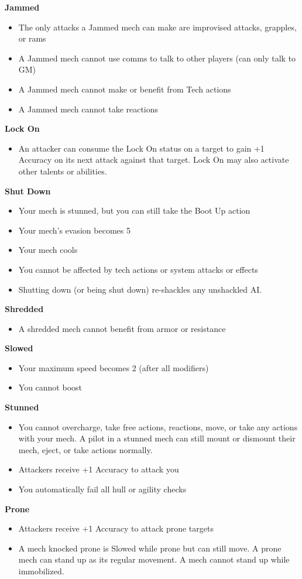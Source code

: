 \textbf{Jammed}
\begin{itemize}
	\item The only attacks a Jammed mech can make are improvised attacks, grapples, or rams
	\item A Jammed mech cannot use comms to talk to other players (can only talk to GM) 
	\item A Jammed mech cannot make or benefit from Tech actions
	\item A Jammed mech cannot take reactions
\end{itemize}

\textbf{Lock On}
\begin{itemize}
	\item An attacker can consume the Lock On status on a target to gain +1 Accuracy on its next attack against that target. Lock On may also activate other talents or abilities.
\end{itemize}

\textbf{Shut Down}
\begin{itemize}
	\item Your mech is stunned, but you can still take the Boot Up action
	\item Your mech's evasion becomes 5
	\item Your mech cools
	\item You cannot be affected by tech actions or system attacks or effects
	\item Shutting down (or being shut down) re-shackles any unshackled AI.
\end{itemize}

\textbf{Shredded}
\begin{itemize}
	\item A shredded mech cannot benefit from armor or resistance
\end{itemize}

\textbf{Slowed}
\begin{itemize}
	\item Your maximum speed becomes 2 (after all modifiers)
	\item You cannot boost
\end{itemize}

\textbf{Stunned}
\begin{itemize}
	\item You cannot overcharge, take free actions, reactions, move, or take any actions with your mech. A pilot in a stunned mech can still mount or dismount their mech, eject, or take actions normally.
	\item Attackers receive +1 Accuracy to attack you
	\item You automatically fail all hull or agility checks
\end{itemize}

\textbf{Prone}
\begin{itemize}
	\item Attackers receive +1 Accuracy to attack prone targets
	\item A mech knocked prone is Slowed while prone but can still move. A prone mech can stand up as its regular movement. A mech cannot stand up while immobilized.
\end{itemize}

